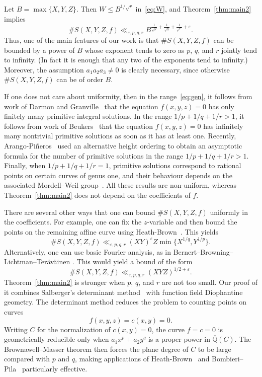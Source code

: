 \documentclass[a4paper,11pt,twoside,reqno]{amsart}
\theoremstyle{definition}
\theoremstyle{remark}
\numberwithin{equation}{section}
\newcommand\ve{\varepsilon}
\newcommand\QQ{\mathbb{Q}}
\newcommand\1{\mathbf{1}}
\renewcommand{\leq}{\leqslant}
\begin{document}
Let $B=\max\{X,Y,Z\}$. Then
$W\leq B^{1/\sqrt{r}}$ in~\eqref{eq:W}, and Theorem~\ref{thm:main2} implies
\[
\#S(X,Y,Z,f)\ll_{\ve,p,q,r}
B^{\frac{1}{\sqrt{p}}+\frac{1}{\sqrt{q}}+\frac{1}{\sqrt{r}}+\ve}.
\]
Thus, one of the main features of our work is that
$\#S(X,Y,Z,f)$ can be bounded by a power of $B$ whose exponent
tends to zero as $p$, $q$, and $r$ jointly tend to infinity.
(In fact it is enough that any two of the exponents  tend to infinity.)
Moreover, the assumption $a_1a_2a_3\neq0$ is clearly necessary,
since otherwise $\#S(X,Y,Z,f)$ can be of order $B$.

If one does not care about uniformity, then in the range~\eqref{eq:gen}, it follows from work of Darmon and Granville~\cite[Theorem 2]{darmon} that the equation $f(x,y,z)=0$ has only finitely many primitive integral solutions.
In the range $1/p + 1/q + 1/r > 1$, 
it follows from work of Beukers~\cite{beukers} that the equation 
$f(x,y,z)=0$ has 
infinitely many nontrivial primitive solutions as soon as it has at least one. 
Recently, Arango-Pi\~neros~\cite{arango-counting}
used an alternative height ordering to 
 obtain an asymptotic formula for the number of primitive solutions in the range $1/p+1/q+1/r>1$. Finally, when $1/p + 1/q + 1/r = 1$, primitive solutions correspond to rational points on certain curves of genus one, and their behaviour depends on the associated Mordell–Weil group~\cite[Section 6]{darmon}. All these results are non-uniform, whereas Theorem~\ref{thm:main2} does not depend on the coefficients of $f$.

There are several other ways that one can bound $\#S(X,Y,Z,f)$ uniformly in the coefficients. For example, one can fix the $z$-variable and then bound the points on the remaining affine curve
using Heath-Brown~\cite[Theorem 15]{HeathBrown}. This yields
\[
\#S(X,Y,Z,f)\ll_{\ve,p,q,r}(XY)^{\ve}Z\min\{X^{1/q},Y^{1/p}\}.
\]
Alternatively, one can use basic Fourier analysis, as in 
Bernert--Browning--Lichtman--Ter\"av\"ainen 
\cite[Proposition 3.1]{abc}. This would yield a bound of the form 
\[
\#S(X,Y,Z,f)\ll_{\ve,p,q,r}(XYZ)^{1/2+\ve}. 
\]
Theorem~\ref{thm:main2}
 is stronger when $p$, $q$, and $r$ are not too small.
Our proof of it combines Salberger's determinant method~\cite{saldet}
 with function field
Diophantine geometry. The determinant method reduces the problem to
counting points on curves
\[
f(x,y,z)=c(x,y)=0.
\]
Writing $C$ for the normalization of $c(x,y)=0$, the curve $f=c=0$
is geometrically reducible only when
$a_1x^p+a_2y^q$
is a proper power in $\overline{\QQ}(C)$. The Brownawell--Masser
theorem then forces the plane degree of $C$ to be large compared with
$p$ and $q$, making applications of Heath-Brown~\cite{HeathBrown} and 
Bombieri--Pila~\cite{BombieriPila} 
particularly effective. 
\end{document}
